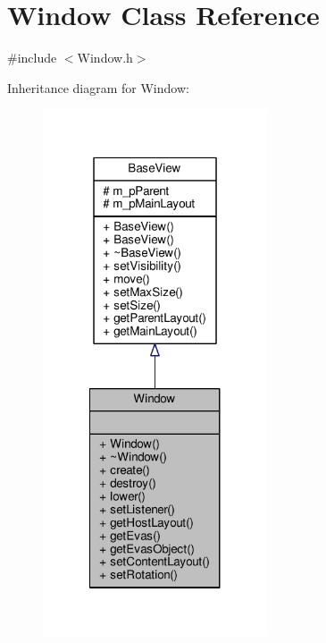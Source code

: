 \hypertarget{class_window}{\section{Window Class Reference}
\label{class_window}
}


{\ttfamily \#include $<$Window.\-h$>$}



Inheritance diagram for Window\-:\nopagebreak
\begin{figure}[H]
\begin{center}
\leavevmode
\includegraphics[width=188pt]{class_window__inherit__graph}
\end{center}
\end{figure}


